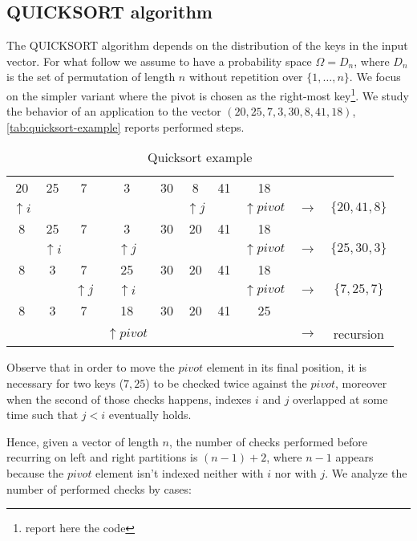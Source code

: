 \subsection{QUICKSORT algorithm}
The QUICKSORT algorithm depends on the distribution of the keys in the
input vector. For what follow we assume to have a probability space
$\Omega = D_n$, where $D_n$ is the set of permutation of length $n$
without repetition over $\{1,\ldots,n\}$. We focus on the simpler
variant where the pivot is chosen as the right-most
key\footnote{report here the code}.  We study the behavior of an
application to the vector $\left ( 20, 25, 7, 3, 30, 8, 41,
  18\right)$, \autoref{tab:quicksort-example} reports performed steps.
\begin{table}[ht]
  \caption{Quicksort example}
  \label{tab:quicksort-example}
  \begin{center}
    \begin{tabular}{cccccccccc}
      20 & 25 & 7 & 3 & 30 & 8 & 41 & 18 &  &  \\
      $\uparrow i$ & & & & & $\uparrow j$ & & $\uparrow pivot$ &
      $\rightarrow$ & $\{20, 41, 8\}$ \\
      8 & 25 & 7 & 3 & 30 & 20 & 41 & 18 &  &  \\
       & $\uparrow i$ & & $\uparrow j$ & &  & & $\uparrow pivot$ &
       $\rightarrow$ & $\{25, 30, 3\}$ \\
       8 & 3 & 7 & 25 & 30 & 20 & 41 & 18 &  &  \\
       &  & $\uparrow j$ & $\uparrow i$ & &  & & $\uparrow pivot$ &
       $\rightarrow$ & $\{7, 25, 7\}$ \\
       8 & 3 & 7 & 18 & 30 & 20 & 41 & 25 &  &  \\
       &  &  & $\uparrow pivot$ & &  & &  &
       $\rightarrow$ & recursion \\
    \end{tabular}
  \end{center}
\end{table}
Observe that in order to move the $pivot$ element in its final
position, it is necessary for two keys ($7, 25$) to be checked
twice against the $pivot$, moreover when the second of those checks
happens, indexes $i$ and $j$ overlapped at some time such that $j < i$
eventually holds.

Hence, given a vector of length $n$, the number of checks
performed before recurring on left and right partitions is $(n-1) + 2$,
where $n-1$ appears because the $pivot$ element isn't indexed neither with
$i$ nor with $j$.  We analyze the number of performed checks by cases:

